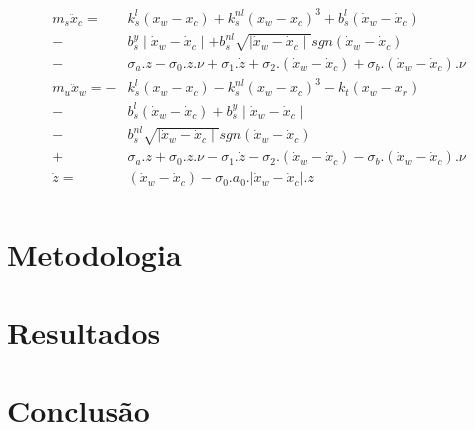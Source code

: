 \documentclass[a4paper]{ifacconf}
\begin{document}
            \begin{equation} \label{eq:massa_mola_nao_linear}
        \begin{aligned}
          m_{s}\ddot{x}_{c}=\ \ &k^{l}_{s}(x_{w}-x_{c})+k^{nl}_{s}(x_{w}-x_{c})^{3}+b^{l}_{s}(\dot{x}_{w}-\dot{x}_{c})\\
                            -&b^{y}_{s}\mid\dot{x}_{w}-\dot{x}_{c}\mid+b^{nl}_{s}\sqrt{\mid\dot{x}_{w}-\dot{x}_{c}\mid}sgn(\dot{x}_{w}-\dot{x}_{c})\\ 
                            -&\sigma_{a}.z-\sigma_{0}.z.\nu+\sigma_{1}.\dot{z}+\sigma_{2}.(\dot{x}_{w}-\dot{x}_{c})+\sigma_{b}.(\dot{x}_{w}-\dot{x}_{c}).\nu\\
          m_{u}\ddot{x}_{w}=-&k^{l}_{s}(x_{w}-x_{c})-k^{nl}_{s}(x_{w}-x_{c})^{3}-k_{t}(x_{w}-x_{r})\\ 
                            -&b^{l}_{s}(\dot{x}_{w}-\dot{x}_{c})+b^{y}_{s}\mid\dot{x}_{w}-\dot{x}_{c}\mid\\
                            -&b^{nl}_{s}\sqrt{\mid\dot{x}_{w}-\dot{x}_{c}\mid}sgn(\dot{x}_{w}-\dot{x}_{c})\\
                            +&\sigma_{a}.z+\sigma_{0}.z.\nu-\sigma_{1}.\dot{z}-\sigma_{2}.(\dot{x}_{w}-\dot{x}_{c})-\sigma_{b}.(\dot{x}_{w}-\dot{x}_{c}).\nu\\
                     \dot{z}=\ \ &(\dot{x}_{w}-\dot{x}_{c})-\sigma_{0}.a_{0}.|\dot{x}_{w}-\dot{x}_{c}|.z\\ 
        \end{aligned}
    \end{equation}
    
    
    \section{Metodologia}
    \section{Resultados}
    \section{Conclusão}
    
    
    
    \appendix
\end{document}
